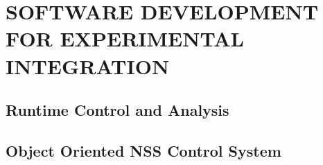 

\chapter{SOFTWARE DEVELOPMENT FOR EXPERIMENTAL INTEGRATION}
\label{chap:SoftwareDevelopmentforExperimentalIntegration}


\section{Runtime Control and Analysis}
\label{sec:RuntimeControlandAnalysis}


\section{Object Oriented NSS Control System}
\label{sec:ObjectOrientedMatlabControlSystem}

